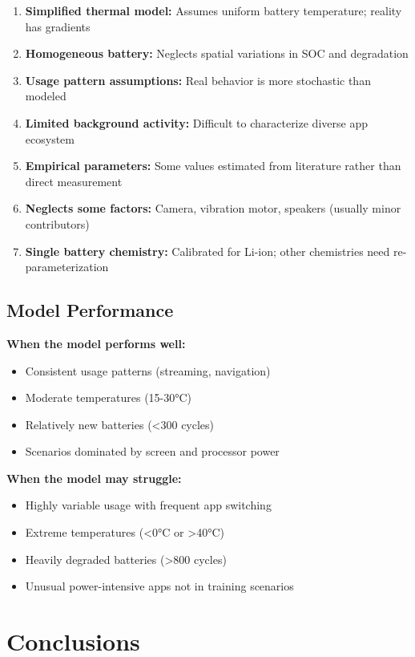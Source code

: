 \documentclass[12pt]{article}
\begin{document}
\begin{enumerate}
\item \textbf{Simplified thermal model:} Assumes uniform battery temperature; reality has gradients
\item \textbf{Homogeneous battery:} Neglects spatial variations in SOC and degradation
\item \textbf{Usage pattern assumptions:} Real behavior is more stochastic than modeled
\item \textbf{Limited background activity:} Difficult to characterize diverse app ecosystem
\item \textbf{Empirical parameters:} Some values estimated from literature rather than direct measurement
\item \textbf{Neglects some factors:} Camera, vibration motor, speakers (usually minor contributors)
\item \textbf{Single battery chemistry:} Calibrated for Li-ion; other chemistries need re-parameterization
\end{enumerate}

\subsection{Model Performance}

\textbf{When the model performs well:}
\begin{itemize}
\item Consistent usage patterns (streaming, navigation)
\item Moderate temperatures (15-30°C)
\item Relatively new batteries (<300 cycles)
\item Scenarios dominated by screen and processor power
\end{itemize}

\textbf{When the model may struggle:}
\begin{itemize}
\item Highly variable usage with frequent app switching
\item Extreme temperatures (<0°C or >40°C)
\item Heavily degraded batteries (>800 cycles)
\item Unusual power-intensive apps not in training scenarios
\end{itemize}

\section{Conclusions}
\end{document}
